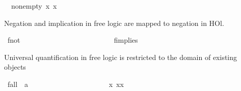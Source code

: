 \begin{isabellebody}
\isanewline
{}\isamarkupfalse%
\ \ non{\isacharunderscore}empty{\isacharcolon}\ {\isachardoublequoteopen}{\isasymexists}x{\isachardot}\ {\isasymA}{\isacharparenleft}x{\isacharparenright}\ {\isachardoublequoteclose}%
\begin{isamarkuptext}%
Negation and implication in free logic are mapped to negation in HOl.%
\end{isamarkuptext}%
\isamarkuptrue%
\isamarkupfalse%
\ f{\isacharunderscore}not\ {\isacharcolon}{\isacharcolon}\ {\isachardoublequoteopen}{\isasymsigma}{\isasymRightarrow}{\isasymsigma}{\isachardoublequoteclose}\ {\isacharparenleft}{\isachardoublequoteopen}\isactrlbold {\isasymnot}{\isacharunderscore}{\isachardoublequoteclose}\ {\isacharbrackleft}{}{}{\isacharbrackright}\ {}{}{\isacharparenright}\ \ \ \ \ \ \ \ \ \ \isanewline
\ \ {\isachardoublequoteopen}\isactrlbold {\isasymnot}{\isasymphi}\ {\isasymequiv}\ {\isasymnot}{\isasymphi}{\isachardoublequoteclose}\ \ \ \ \ \isanewline
{}\isamarkupfalse%
\ f{\isacharunderscore}implies\ {\isacharcolon}{\isacharcolon}\ {\isachardoublequoteopen}{\isasymsigma}{\isasymRightarrow}{\isasymsigma}{\isasymRightarrow}{\isasymsigma}{\isachardoublequoteclose}\ {\isacharparenleft}\ {\isachardoublequoteopen}\isactrlbold {\isasymrightarrow}{\isachardoublequoteclose}\ {}{}{\isacharparenright}\ \ \ \isanewline
\ \ {\isachardoublequoteopen}{\isasymphi}\isactrlbold {\isasymrightarrow}{\isasympsi}\ {\isasymequiv}\ {\isasymphi}{\isasymlongrightarrow}{\isasympsi}{\isachardoublequoteclose}%
\begin{isamarkuptext}%
Universal quantification in free logic is restricted to the domain of existing objects%
\end{isamarkuptext}%
\isamarkuptrue%
\isamarkupfalse%
\ f{\isacharunderscore}all\ {\isacharcolon}{\isacharcolon}\ {\isachardoublequoteopen}{\isacharparenleft}{\isacharprime}a{\isasymRightarrow}{\isasymsigma}{\isacharparenright}{\isasymRightarrow}{\isasymsigma}{\isachardoublequoteclose}\ {\isacharparenleft}{\isachardoublequoteopen}\isactrlbold {\isasymforall}{\isachardoublequoteclose}{\isacharparenright}\ \ \ \ \ \ \ \ \ \ \ \ \ \ \ \ \ \isanewline
\ \ {\isachardoublequoteopen}\isactrlbold {\isasymforall}{\isasymPhi}\ {\isasymequiv}\ {\isasymforall}x{\isachardot}\ {\isasymA}{\isacharparenleft}x{\isacharparenright}{\isasymlongrightarrow}{\isasymPhi}{\isacharparenleft}x{\isacharparenright}{\isachardoublequoteclose}\ \ \ \isanewline

\end{isabellebody}
